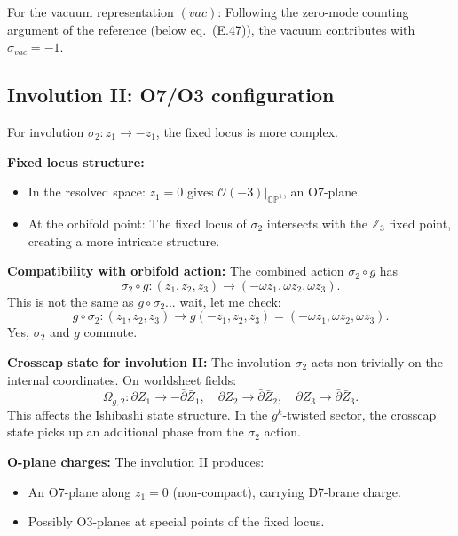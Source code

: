 \documentclass[11pt]{article}
\newcommand{\Z}{\mathbb{Z}}
\newcommand{\CP}{\mathbb{CP}}
\newcommand{\cO}{\mathcal{O}}
\begin{document}
For the vacuum representation $(vac)$: Following the zero-mode counting argument of the reference (below eq.~(E.47)), the vacuum contributes with $\sigma_{vac} = -1$.

\subsection{Involution II: O7/O3 configuration}

For involution $\sigma_2: z_1 \to -z_1$, the fixed locus is more complex.

\textbf{Fixed locus structure:}
\begin{itemize}
\item In the resolved space: $z_1 = 0$ gives $\cO(-3)|_{\CP^1}$, an O7-plane.
\item At the orbifold point: The fixed locus of $\sigma_2$ intersects with the $\Z_3$ fixed point, creating a more intricate structure.
\end{itemize}

\textbf{Compatibility with orbifold action:} The combined action $\sigma_2 \circ g$ has
\begin{equation}
\sigma_2 \circ g: (z_1, z_2, z_3) \to (-\omega z_1, \omega z_2, \omega z_3).
\end{equation}
This is not the same as $g \circ \sigma_2$... wait, let me check:
\begin{equation}
g \circ \sigma_2: (z_1, z_2, z_3) \to g(-z_1, z_2, z_3) = (-\omega z_1, \omega z_2, \omega z_3).
\end{equation}
Yes, $\sigma_2$ and $g$ commute.

\textbf{Crosscap state for involution II:} The involution $\sigma_2$ acts non-trivially on the internal coordinates. On worldsheet fields:
\begin{equation}
\Omega_{g,2}: \partial Z_1 \to -\bar{\partial} \bar{Z}_1, \quad \partial Z_2 \to \bar{\partial} \bar{Z}_2, \quad \partial Z_3 \to \bar{\partial} \bar{Z}_3.
\end{equation}
This affects the Ishibashi state structure. In the $g^k$-twisted sector, the crosscap state picks up an additional phase from the $\sigma_2$ action.

\textbf{O-plane charges:} The involution II produces:
\begin{itemize}
\item An O7-plane along $z_1 = 0$ (non-compact), carrying D7-brane charge.
\item Possibly O3-planes at special points of the fixed locus.
\end{itemize}
\end{document}
